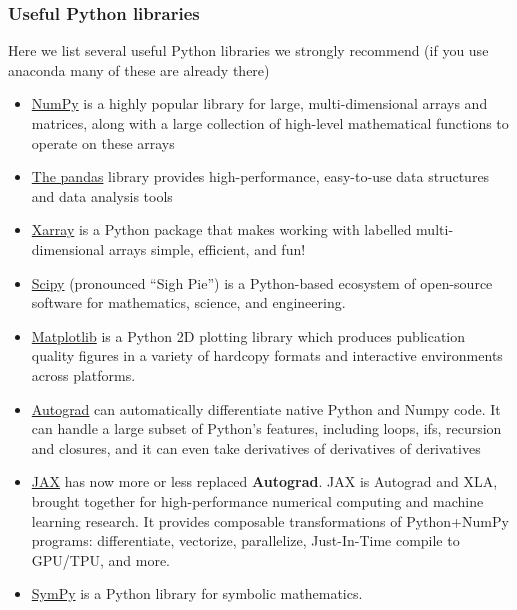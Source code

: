 \documentclass{beamer}
\begin{document}
\begin{frame}
\frametitle{Useful Python libraries}

Here we list several useful Python libraries we strongly recommend (if you use anaconda many of these are already there)

\begin{itemize}
\item \href{{https://www.numpy.org/}}{NumPy} is a highly popular library for large, multi-dimensional arrays and matrices, along with a large collection of high-level mathematical functions to operate on these arrays

\item \href{{https://pandas.pydata.org/}}{The pandas} library provides high-performance, easy-to-use data structures and data analysis tools 

\item \href{{http://xarray.pydata.org/en/stable/}}{Xarray} is a Python package that makes working with labelled multi-dimensional arrays simple, efficient, and fun!

\item \href{{https://www.scipy.org/}}{Scipy} (pronounced “Sigh Pie”) is a Python-based ecosystem of open-source software for mathematics, science, and engineering. 

\item \href{{https://matplotlib.org/}}{Matplotlib} is a Python 2D plotting library which produces publication quality figures in a variety of hardcopy formats and interactive environments across platforms.

\item \href{{https://github.com/HIPS/autograd}}{Autograd} can automatically differentiate native Python and Numpy code. It can handle a large subset of Python's features, including loops, ifs, recursion and closures, and it can even take derivatives of derivatives of derivatives

\item \href{{https://jax.readthedocs.io/en/latest/index.html}}{JAX} has now more or less replaced \textbf{Autograd}. JAX is Autograd and XLA, brought together for high-performance numerical computing and machine learning research. It provides composable transformations of Python+NumPy programs: differentiate, vectorize, parallelize, Just-In-Time compile to GPU/TPU, and more.

\item \href{{https://www.sympy.org/en/index.html}}{SymPy} is a Python library for symbolic mathematics. 


\end{itemize}
\end{frame}
\end{document}
